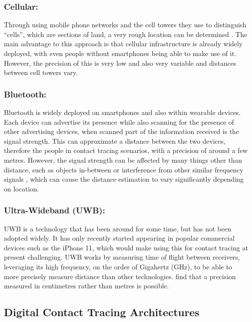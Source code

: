 \documentclass{l4proj}
\begin{document}
\subsubsection{Cellular:}

Through using mobile phone networks and the cell towers they use to distinguish “cells”, which are sections of land, a very rough location can be determined \citep{hernandez-orallo_evaluating_2020}. The main advantage to this approach is that cellular infrastructure is already widely deployed, with even people without smartphones being able to make use of it. However, the precision of this is very low and also very variable and distances between cell towers vary.

\subsubsection{Bluetooth:}

Bluetooth is widely deployed on smartphones and also within wearable devices. Each device can advertise its presence while also scanning for the presence of other advertising devices, when scanned part of the information received is the signal strength. This can approximate a distance between the two devices, therefore the people in contact tracing scenarios, with a precision of around a few metres. However, the signal strength can be affected by many things other than distance, such as objects in-between or interference from other similar frequency signals \citep{ahmed_survey_2020}, which can cause the distance estimation to vary significantly depending on location.

\subsubsection{Ultra-Wideband (UWB):}

UWB is a technology that has been around for some time, but has not been adopted widely. It has only recently started appearing in popular commercial devices such as the iPhone 11, which would make using this for contact tracing at present challenging. UWB works by measuring time of flight between receivers, leveraging its high frequency, on the order of Gigahertz (GHz), to be able to more precisely measure distance than other technologies. \citet{angelis_experimental_2008} find that a precision measured in centimetres rather than metres is possible.

\subsection{Digital Contact Tracing Architectures}
\end{document}
